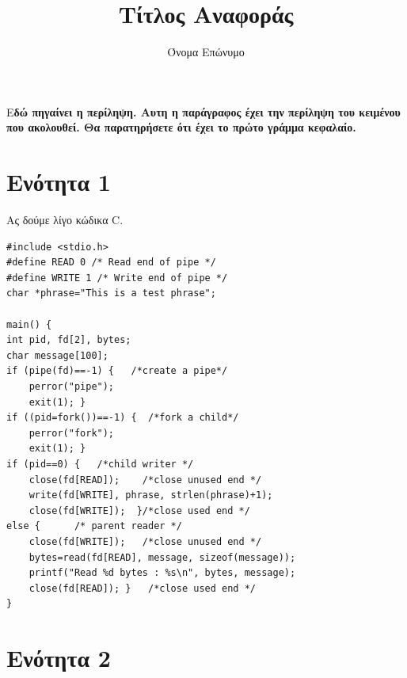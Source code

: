 \documentclass[DIV=calc, paper=a4, fontsize=10pt, twocolumn]{scrartcl}	 %
\title{Τίτλος Αναφοράς} %
\author{Όνομα Επώνυμο } %
\date{} %
\newcommand{\initial}[1]{ %
\lettrine[lines=3,lhang=0.3,nindent=0em]{
\color{DarkGoldenrod}
{\textsf{#1}}}{}}
\begin{document}
\maketitle %

\thispagestyle{fancy} %


\initial{Ε}\textbf{δώ πηγαίνει η περίληψη. Αυτη η παράγραφος έχει την περίληψη του κειμένου που ακολουθεί. Θα παρατηρήσετε ότι έχει το πρώτο γράμμα κεφαλαίο. }



\section{Ενότητα 1}

Ας δούμε λίγο κώδικα C.

\begin{lstlisting}
#include <stdio.h>
#define READ 0 /* Read end of pipe */
#define WRITE 1 /* Write end of pipe */
char *phrase="This is a test phrase";

main() {
int pid, fd[2], bytes;
char message[100];
if (pipe(fd)==-1) {   /*create a pipe*/
	perror("pipe");
	exit(1); }
if ((pid=fork())==-1) {  /*fork a child*/
	perror("fork");
	exit(1); }
if (pid==0) {	/*child writer */
	close(fd[READ]);	/*close unused end */
	write(fd[WRITE], phrase, strlen(phrase)+1);
	close(fd[WRITE]);  }/*close used end */
else {		/* parent reader */
	close(fd[WRITE]);	/*close unused end */
	bytes=read(fd[READ], message, sizeof(message));
	printf("Read %d bytes : %s\n", bytes, message);
	close(fd[READ]); }	 /*close used end */
}
\end{lstlisting}


\section{Ενότητα 2}
\end{document}
